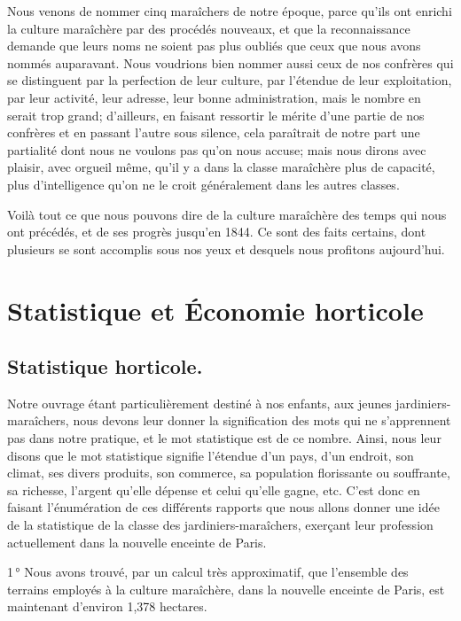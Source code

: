 \documentclass[10pt,a4paper]{book}
\begin{document}
Nous venons de nommer cinq maraîchers de notre époque, parce qu'ils ont enrichi la culture maraîchère par des procédés nouveaux, et que la reconnaissance demande que leurs noms ne soient pas plus oubliés que ceux que nous avons nommés auparavant. Nous voudrions bien nommer aussi ceux de nos confrères qui se distinguent par la perfection de leur culture, par l'étendue de leur exploitation, par leur activité, leur adresse, leur bonne administration, mais le nombre en serait trop grand; d'ailleurs, en faisant ressortir le mérite d'une partie de nos confrères et en passant l'autre sous silence, cela paraîtrait de notre part une partialité dont nous ne voulons pas qu'on nous accuse; mais nous dirons avec plaisir, avec orgueil même, qu'il y a dans la classe maraîchère plus de capacité, plus d'intelligence qu'on ne le croit généralement dans les autres classes.

Voilà tout ce que nous pouvons dire de la culture maraîchère des temps qui nous ont précédés, et de ses progrès jusqu'en 1844. Ce sont des faits certains, dont plusieurs se sont accomplis sous nos yeux et desquels nous profitons aujourd'hui.

\chapter{Statistique et Économie horticole}

\section{Statistique horticole.}

Notre ouvrage étant particulièrement destiné à nos enfants, aux jeunes jardiniers-maraîchers, nous devons leur donner la signification des mots qui ne s'apprennent pas dans notre pratique, et le mot statistique est de ce nombre. Ainsi, nous leur disons que le mot statistique signifie l'étendue d'un pays, d'un endroit, son climat, ses divers produits, son commerce, sa population florissante ou souffrante, sa richesse, l'argent qu'elle dépense et celui qu'elle gagne, etc. C'est donc en faisant l'énumération de ces différents rapports que nous allons donner une idée de la statistique de la classe des jardiniers-maraîchers, exerçant leur profession actuellement dans la nouvelle enceinte de Paris.

1\,° Nous avons trouvé, par un calcul très approximatif, que l'ensemble des terrains employés à la culture maraîchère, dans la nouvelle enceinte de Paris, est maintenant d'environ 1,378 hectares.
\end{document}
